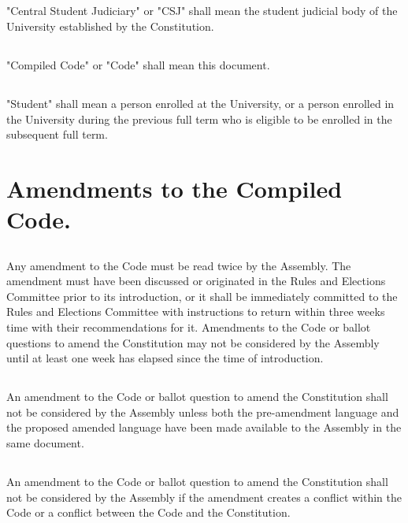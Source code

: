\subsection{}
"Central Student Judiciary" or "CSJ" shall mean the student judicial body of the University established by the Constitution.

\subsection{}
"Compiled Code" or "Code" shall mean this document.

\subsection{}
"Student" shall mean a person enrolled at the University, or a person enrolled in the University during the previous full term who is eligible to be enrolled in the subsequent full term.


\section{Amendments to the Compiled Code.}

\subsection{}
Any amendment to the Code must be read twice by the Assembly. The amendment must have been discussed or originated in the Rules and Elections Committee prior to its introduction, or it shall be immediately committed to the Rules and Elections Committee with instructions to return within three weeks time with their recommendations for it. Amendments to the Code or ballot questions to amend the Constitution may not be considered by the Assembly until at least one week has elapsed since the time of introduction.

\subsection{}
An amendment to the Code or ballot question to amend the Constitution shall not be considered by the Assembly unless both the pre-amendment language and the proposed amended language have been made available to the Assembly in the same document.

\subsection{}
An amendment to the Code or ballot question to amend the Constitution shall not be considered by the Assembly if the amendment creates a conflict within the Code or a conflict between the Code and the Constitution.

